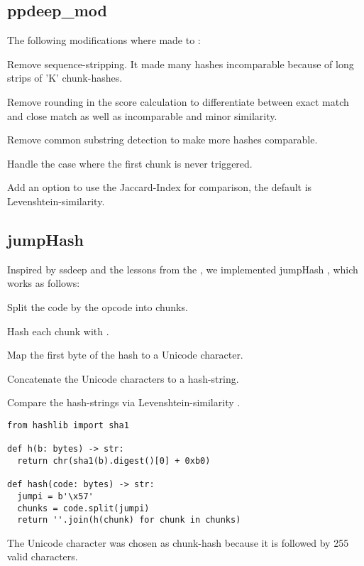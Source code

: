 \documentclass[../main.tex]{subfiles}
\begin{document}
\subsection{ppdeep\_mod \label{sec:ppdeep_mod}}
The following modifications where made to :
\begin{ul}
  \item Remove sequence-stripping. It made many hashes incomparable because of long strips of 'K' chunk-hashes.
  \item Remove rounding in the score calculation to differentiate between exact match and close match as well as incomparable and minor similarity.
  \item Remove common substring detection to make more hashes comparable.
  \item Handle the case where the first chunk is never triggered.
  \item Add an option to use the Jaccard-Index for comparison, the default is Levenshtein-similarity.
\end{ul}

\subsection{jumpHash \label{sec:jump}}
Inspired by ssdeep and the lessons from the , we implemented jumpHash \cite{ethereum-contract-similarity}, which works as follows:
\begin{ol}
  \item Split the code by the opcode  into chunks.
  \item Hash each chunk with .
  \item Map the first byte of the  hash to a Unicode character.
  \item Concatenate the Unicode characters to a hash-string.
  \item Compare the hash-strings via Levenshtein-similarity .
\end{ol}
\begin{lstlisting}[style=pymd]
from hashlib import sha1

def h(b: bytes) -> str:
  return chr(sha1(b).digest()[0] + 0xb0)

def hash(code: bytes) -> str:
  jumpi = b'\x57'
  chunks = code.split(jumpi)
  return ''.join(h(chunk) for chunk in chunks)
\end{lstlisting}
The Unicode character  was chosen as  chunk-hash because it is followed by 255 valid characters.
\end{document}
